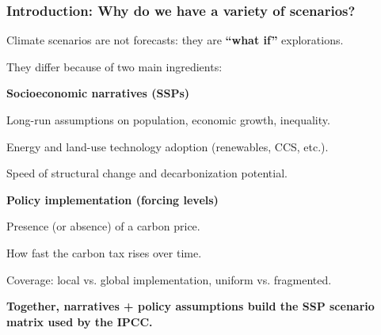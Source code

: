 \documentclass[xcolor=x11names,compress,aspectratio=169]{beamer}%
\makeatletter
\renewenvironment{itemize}{\begin{compactitemize}[<+-| alert@+>]}{\end{compactitemize}}
\makeatother
\begin{document}
\begin{frame}%
%

\frametitle{Introduction: Why do we have a variety of scenarios?}%


\begin{itemize}
\item Climate scenarios are not forecasts: they are \textbf{``what if''}
explorations. \vspace{0.5em}

\item They differ because of two main ingredients:%
\vspace{1ex}%


\begin{enumerate}
\item \textbf{Socioeconomic narratives (SSPs)}

\begin{itemize}
\item Long-run assumptions on population, economic growth, inequality.

\item Energy and land-use technology adoption (renewables, CCS, etc.).

\item Speed of structural change and decarbonization potential.
\end{itemize}

\item \textbf{Policy implementation (forcing levels)}

\begin{itemize}
\item Presence (or absence) of a carbon price.

\item How fast the carbon tax rises over time.

\item Coverage: local vs. global implementation, uniform vs. fragmented.
\end{itemize}
\end{enumerate}

\vspace{0.8em}

\item \textbf{Together, narratives + policy assumptions build the SSP scenario
matrix used by the IPCC.}
\end{itemize}

%

\transboxout
\end{frame}%
%
\end{document}
